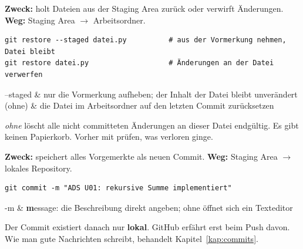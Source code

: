 
\textbf{Zweck:} holt Dateien aus der Staging Area zurück oder verwirft Änderungen.
\textbf{Weg:} Staging Area $\rightarrow$ Arbeitsordner.

\begin{lstlisting}[style=befehle]
git restore --staged datei.py          # aus der Vormerkung nehmen, Datei bleibt
git restore datei.py                   # Änderungen an der Datei verwerfen
\end{lstlisting}

\begin{teile}
  --staged & nur die Vormerkung aufheben; der Inhalt der Datei bleibt unverändert \\
  (ohne)   & die Datei im Arbeitsordner auf den letzten Commit zurücksetzen \\
\end{teile}

\begin{achtung}
 \emph{ohne}  löscht alle nicht committeten
Änderungen an dieser Datei endgültig. Es gibt keinen Papierkorb. Vorher mit
 prüfen, was verloren ginge.
\end{achtung}


\textbf{Zweck:} speichert alles Vorgemerkte als neuen Commit.
\textbf{Weg:} Staging Area $\rightarrow$ lokales Repository.

\begin{lstlisting}[style=befehle]
git commit -m "ADS U01: rekursive Summe implementiert"
\end{lstlisting}

\begin{teile}
  -m & \textbf{m}essage: die Beschreibung direkt angeben; ohne  öffnet sich ein Texteditor \\
\end{teile}

Der Commit existiert danach nur \textbf{lokal}. GitHub erfährt erst beim Push davon. Wie man
gute Nachrichten schreibt, behandelt Kapitel~\ref{kap:commits}.


